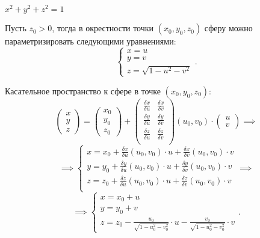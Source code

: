 \begin{example}
    $x^2 + y^2 + z^2 = 1$

    Пусть $z_0 > 0$, тогда в окрестности точки $(x_0,y_0,z_0)$ сферу можно параметризировать следующими уравнениями:
    \[
        \left\{\begin{array}{l}
            x = u \\
            y = v \\
            z = \sqrt{1 - u^2 - v^2}
        \end{array}\right..
    \]

    Касательное пространство к сфере в точке $(x_0,y_0,z_0)$:
    \[
        \left(\begin{matrix}
                x \\
                y \\
                z
            \end{matrix}\right) = \left(\begin{matrix}
                x_0 \\
                y_0 \\
                z_0
            \end{matrix}\right) + \left(\begin{matrix}
                \frac{\delta x}{\delta u} & \frac{\delta x}{\delta v} \\
                \frac{\delta y}{\delta u} & \frac{\delta y}{\delta v} \\
                \frac{\delta z}{\delta u} & \frac{\delta z}{\delta v} \\
            \end{matrix}\right) (u_0,v_0) \cdot \left(\begin{matrix}
                u \\
                v
            \end{matrix}\right) \implies
    \]
    \[
        \implies \left\{\begin{array}{l}
            x = x_0 + \frac{\delta x}{\delta u}(u_0,v_0) \cdot u + \frac{\delta x}{\delta v}(u_0,v_0)\cdot v \\
            y = y_0 + \frac{\delta y}{\delta u}(u_0,v_0) \cdot u + \frac{\delta y}{\delta v}(u_0,v_0)\cdot v \\
            z = z_0 + \frac{\delta z}{\delta u}(u_0,v_0) \cdot u + \frac{\delta z}{\delta v}(u_0,v_0)\cdot v \\
        \end{array}\right. \implies
    \]
    \[
        \implies \left\{\begin{array}{l}
            x = x_0 + u \\
            y = y_0 + v \\
            z = z_0 - \frac{u_0}{\sqrt{1 - u_0^2 - v_0^2}}\cdot u - \frac{v_0}{\sqrt{1 - u_0^2 - v_0^2}}\cdot v
        \end{array}\right..
    \]
\end{example}

